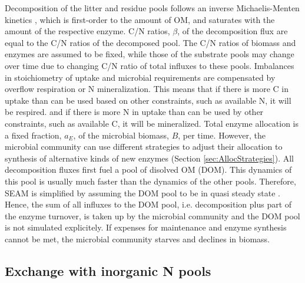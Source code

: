 Decomposition of the litter and residue pools follows an inverse
Michaelis-Menten kinetics \citep{Schimel03}, which is first-order to the amount
of OM, and saturates with the amount of the respective enzyme. C/N ratios,
$\beta$, of the decomposition flux are equal to the C/N ratios of the decomposed
pool. The C/N ratios of biomass and enzymes are assumed to be fixed, while those
of the substrate pools may change over time due to changing C/N ratio of total
influxes to these pools. Imbalances in stoichiometry of uptake and microbial
requirements are compensated by overflow respiration or N mineralization. This
means that if there is more C in uptake than can be used based on other
constraints, such as available N, it will be respired. and if there is more N in
uptake than can be used by other constraints, such as available C, it will be
mineralized.
Total enzyme allocation is a fixed fraction, $a_E$, of the microbial biomass,
$B$, per time. However, the microbial community can use different strategies to
adjust their allocation to synthesis of alternative kinds of new enzymes
(Section \ref{sec:AllocStrategies}).
All decomposition fluxes first fuel a pool of disolved OM (DOM). This dynamics
of this pool is usually much faster than the dynamics of the other pools.
Therefore, SEAM is simplified by assuming the DOM pool to be in quasi steady
state \citep{Wutzler13}. Hence, the sum of all influxes to the DOM pool, i.e.
decomposition plus part of the enzyme turnover, is taken up by the microbial
community and the DOM pool is not simulated explicitely.
If expenses for maintenance and enzyme synthesis cannot be met, the microbial
community starves and declines in biomass.

\subsection{Exchange with inorganic N pools}


